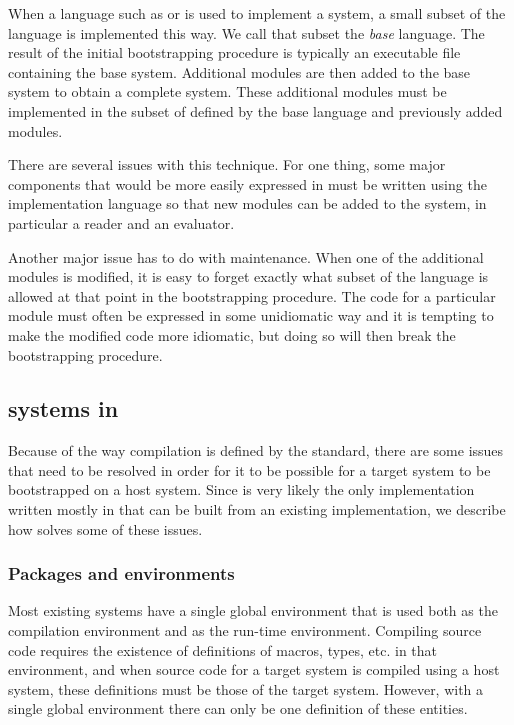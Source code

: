 When a language such as \clanguage{} or \cplusplus{} is used to
implement a \commonlisp{} system, a small subset of the \commonlisp{}
language is implemented this way.  We call that subset the \emph{base}
language.  The result of the initial bootstrapping procedure is
typically an executable file containing the base system.  Additional
modules are then added to the base system to obtain a complete
\commonlisp{} system.  These additional modules must be implemented in
the subset of \commonlisp{} defined by the base language and
previously added modules.

There are several issues with this technique.  For one thing, some
major components that would be more easily expressed in \commonlisp{}
must be written using the implementation language so that new modules
can be added to the system, in particular a reader and an evaluator.

Another major issue has to do with maintenance.  When one of the
additional modules is modified, it is easy to forget exactly what
subset of the \commonlisp{} language is allowed at that point in the
bootstrapping procedure.  The code for a particular module must often be
expressed in some unidiomatic way and it is tempting to make the
modified code more idiomatic, but doing so will then break the
bootstrapping procedure.

\subsection{\commonlisp{} systems in \commonlisp{}}
\label{sec-cl-in-cl}

Because of the way compilation is defined by the \commonlisp{}
standard, there are some issues that need to be resolved in order for
it to be possible for a target \commonlisp{} system to be bootstrapped
on a host \commonlisp{} system.  Since \sbcl{} is very likely the only
\commonlisp{} implementation written mostly in \commonlisp{} that can
be built from an existing \commonlisp{} implementation, we describe
how \sbcl{} solves some of these issues.

\subsubsection{Packages and environments}
\label{sec-cl-in-cl}

Most existing \commonlisp{} systems have a single global environment
that is used both as the compilation environment and as the run-time
environment.  Compiling \commonlisp{} source code requires the
existence of definitions of macros, types, etc. in that environment,
and when source code for a target \commonlisp{} system is compiled
using a host \commonlisp{} system, these definitions must be those of
the target system.  However, with a single global environment there
can only be one definition of these entities.

